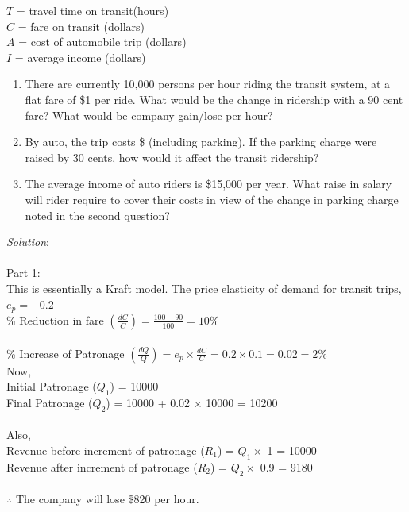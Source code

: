 \hspace*{10mm} $T$ = travel time on transit(hours)\\
\hspace*{10mm} $C$ = fare on transit (dollars)\\
\hspace*{10mm} $A$ = cost of automobile trip (dollars)\\
\hspace*{10mm} $I$ = average income (dollars)
\begin{enumerate}
	\item There are currently 10,000 persons per hour riding the transit system, at a flat fare of \$1 per ride. What would be the change in ridership with a 90 cent fare? What would be company gain/lose per hour?
	\item By auto, the trip costs \$ (including parking). If the parking charge were raised by 30 cents, how would it affect the transit ridership?
	\item The average income of auto riders is \$15,000 per year. What raise in salary will rider require to cover their costs in view of the change in parking charge noted in the second question?
\end{enumerate}
\textit{Solution}:\\\\
Part 1:\\
This is essentially a Kraft model. The price elasticity of demand for transit trips,\\
$e_p = -0.2$\\
\% Reduction in fare $(\frac{dC}{C}) = \frac{100 - 90}{100} = 10\%$\\\\
\% Increase of Patronage $(\frac{dQ}{Q}) = e_p \times \frac{dC}{C} = 0.2 \times 0.1 = 0.02 = 2\%$\\
Now,\\
Initial Patronage ($Q_1$) = 10000\\
Final Patronage ($ Q_2 $) = 10000 + 0.02 $\times$ 10000 = 10200\\\\
Also,\\
Revenue before increment of patronage ($R_1$) = $Q_1 \times$ 1 = 10000\\
Revenue after increment of patronage ($R_2$) = $Q_2 \times$ 0.9 = 9180\\\\
$\therefore$ The company will lose \$820 per hour.\\\\

